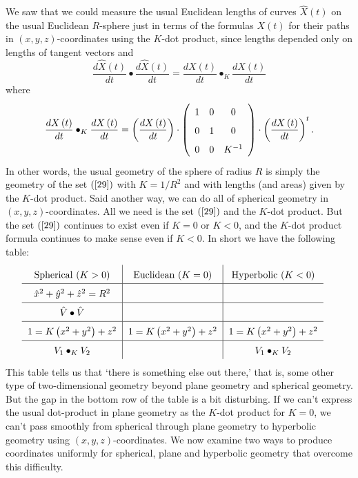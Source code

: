 We saw that we could measure the usual Euclidean lengths of curves $\hat
{X}\left(  t\right)  $ on the usual Euclidean $R$-sphere just in terms of the
formulas $X\left(  t\right)  $ for their paths in $\left(  x,y,z\right)
$-coordinates using the $K$-dot product, since lengths depended only on
lengths of tangent vectors and%
\[
\frac{d\hat{X}\left(  t\right)  }{dt}\bullet\frac{d\hat{X}\left(  t\right)
}{dt}=\frac{dX\left(  t\right)  }{dt}\bullet_{K}\frac{dX\left(  t\right)
}{dt}%
\]
where%
\[
\frac{dX\left(  t\right)  }{dt}\bullet_{K}\frac{dX\left(  t\right)  }%
{dt}=\left(  \frac{dX\left(  t\right)  }{dt}\right)  \cdot\left(
\begin{array}
[c]{ccc}%
1 & 0 & 0\\
0 & 1 & 0\\
0 & 0 & K^{-1}%
\end{array}
\right)  \cdot\left(  \frac{dX\left(  t\right)  }{dt}\right)  ^{t}.
\]
In other words, the usual geometry of the sphere of radius $R$ is simply the
geometry of the set $\left(  \ref{29}\right)  $ with $K=1/R^{2}$ and with
lengths (and areas) given by the $K$-dot product. Said another way, we can do
all of spherical geometry in $\left(  x,y,z\right)  $-coordinates. All we need
is the set $\left(  \ref{29}\right)  $ and the $K$-dot product. But the set
$\left(  \ref{29}\right)  $ continues to exist even if $K=0$ or $K<0$, and the
$K$-dot product formula continues to make sense even if $K<0$. In short we
have the following table:
\begin{equation}%
{\renewcommand{\arraystretch}{1.6}
\begin{tabular}
[c]{c|c|c}%
Spherical ($K>0$) & Euclidean ($K=0$) & Hyperbolic ($K<0$)\\\hline
$\hat{x}^{2}+\hat{y}^{2}+\hat{z}^{2}=R^{2}$ &  & \\\hline
$\hat{V}\bullet\hat{V}$ &  & \\\hline
$1=K\left(  x^{2}+y^{2}\right)  +z^{2}$ & $1=K\left(  x^{2}+y^{2}\right)
+z^{2}$ & $1=K\left(  x^{2}+y^{2}\right)  +z^{2}$\\ \hline
$V_{1}\bullet_{K}V_{2}$ &  & $V_{1}\bullet_{K}V_{2}$%
\end{tabular}}
\ \ \ \ \label{66}%
\end{equation}
This table tells us that `there is something else out there,' that is, some
other type of two-dimensional geometry beyond plane geometry and spherical
geometry. But the gap in the bottom row of the table is a bit disturbing. If
we can't express the usual dot-product in plane geometry as the $K$-dot
product for $K=0$, we can't pass smoothly from spherical through plane
geometry to hyperbolic geometry using $\left(  x,y,z\right)  $-coordinates. We
now examine two ways to produce coordinates uniformly for spherical, plane and
hyperbolic geometry that overcome this difficulty.
